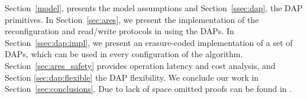Section~\ref{model}, presents the model assumptions 
and Section~\ref{ssec:dap}, the DAP  primitives.  
 In Section~\ref{sec:ares}, we present the implementation of the reconfiguration and read/write 
 protocols in \ares{} using the DAPs.
 In Section~\ref{ssec:dap:impl}, we present an erasure-coded implementation of a set of  DAPs, which 
 can be used in every configuration of 
 the \ares{} algorithm.
 Section~\ref{sec:ares_safety} provides operation latency and cost analysis, and Section 
 \ref{sec:dap:flexible} the DAP flexibility. 
 We conclude our work in Section~\ref{sec:conclusions}.
  Due to lack of space omitted proofs can be found in 
  \cite{ARES:Arxiv:2018}.


